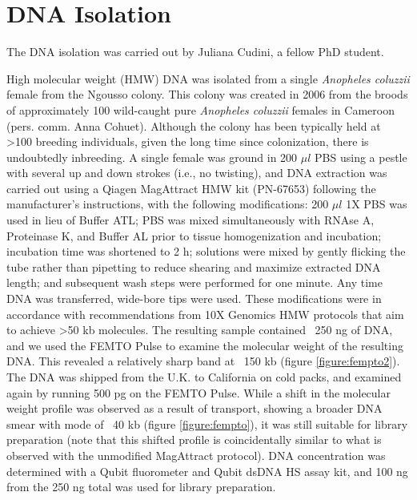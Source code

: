 \section{DNA Isolation}

The DNA isolation was carried out by Juliana Cudini, a fellow PhD student. \\

\par{
High molecular weight (HMW) DNA was isolated from a single \textit{Anopheles coluzzii} female from the Ngousso colony. This colony was created in 2006 from the broods of approximately 100 wild-caught pure \textit{Anopheles coluzzii} females in Cameroon (pers. comm. Anna Cohuet). Although the colony has been typically held at >100 breeding individuals, given the long time since colonization, there is undoubtedly inbreeding. A single female was ground in 200 $\mu l$ PBS using a pestle with several up and down strokes (i.e., no twisting), and DNA extraction was carried out using a Qiagen MagAttract HMW kit (PN-67653) following the manufacturer's instructions, with the following modifications: 200 $\mu l$ 1X PBS was used in lieu of Buffer ATL; PBS was mixed simultaneously with RNAse A, Proteinase K, and Buffer AL prior to tissue homogenization and incubation; incubation time was shortened to 2 h; solutions were mixed by gently flicking the tube rather than pipetting to reduce shearing and maximize extracted DNA length; and subsequent wash steps were performed for one minute. Any time DNA was transferred, wide-bore tips were used. These modifications were in accordance with recommendations from 10X Genomics HMW protocols that aim to achieve >50 kb molecules. The resulting sample contained ~250 ng of DNA, and we used the FEMTO Pulse to examine the molecular weight of the resulting DNA. This revealed a relatively sharp band at ~150 kb (figure \ref{figure:fempto2}). The DNA was shipped from the U.K. to California on cold packs, and examined again by running 500 pg on the FEMTO Pulse. While a shift in the molecular weight profile was observed as a result of transport, showing a broader DNA smear with mode of ~40 kb (figure \ref{figure:fempto}), it was still suitable for library preparation (note that this shifted profile is coincidentally similar to what is observed with the unmodified MagAttract protocol). DNA concentration was determined with a Qubit fluorometer and Qubit dsDNA HS assay kit, and 100 ng from the 250 ng total was used for library preparation.
}


